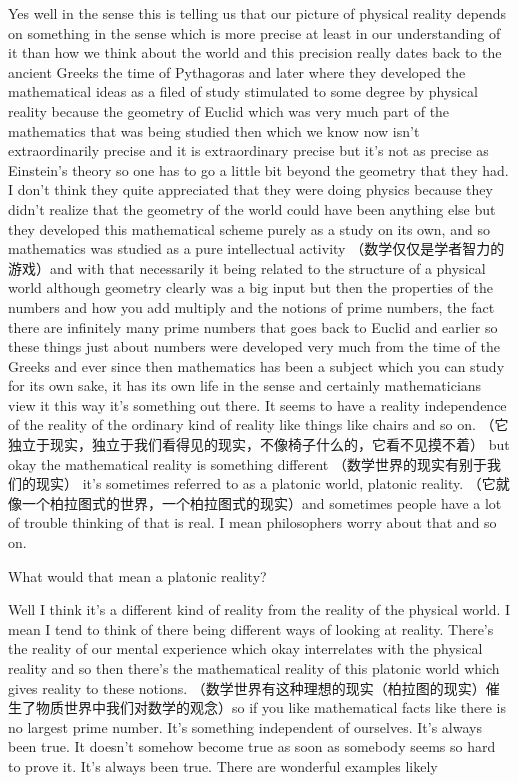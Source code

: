 \documentclass{article}
\begin{document}
Yes well in the sense this is telling us that our picture of physical reality depends on something in the sense which is more precise at least in our understanding of it than how we think about the world  and this precision really dates back to the ancient Greeks the time  of Pythagoras and later where they developed the mathematical ideas as a filed of study  stimulated to some degree by physical reality because the geometry of Euclid which was very much part of the mathematics that was being studied then which we know now isn't extraordinarily precise and it is  
 extraordinary precise  but it's not as precise as Einstein's theory so one has to go a little bit beyond the geometry that they had. I don't think they quite appreciated that they were doing physics because they didn't realize that the geometry of the world could have been anything else but they developed this mathematical scheme purely as a study on its own, and so mathematics was studied as a pure intellectual activity （数学仅仅是学者智力的游戏）and with that necessarily it being related to the structure of a physical world although geometry clearly was a big input but then the properties of the numbers and how you add multiply and the notions of prime numbers, the fact there are infinitely many prime numbers that goes back to Euclid and earlier so these things just about numbers were developed very much from the time of the Greeks and ever since then mathematics has been a subject which you can study for its own sake, it has its own life in the sense and certainly mathematicians view it this way it's something out there. It seems to have a reality independence of the reality of the ordinary kind of reality like things like chairs and so on. （它独立于现实，独立于我们看得见的现实，不像椅子什么的，它看不见摸不着） but okay the mathematical reality is something different （数学世界的现实有别于我们的现实） it's sometimes referred to as a platonic world, platonic reality. （它就像一个柏拉图式的世界，一个柏拉图式的现实）and sometimes people have a lot of trouble thinking of that is real. I mean philosophers worry about that and so on.
 
What would that mean a platonic reality?

Well I think it's a different kind of reality from the reality of the physical world. I mean I tend to think of there being different ways of looking at reality. There's the reality of our mental experience which okay interrelates with the physical reality and so then there's the mathematical reality of this platonic world which gives reality to these notions. （数学世界有这种理想的现实（柏拉图的现实）催生了物质世界中我们对数学的观念）so if you like mathematical facts like there is no largest prime number. It's something independent of ourselves. It's always been true. It doesn't somehow become true as soon as somebody seems so hard to prove it. It's always been true. There are wonderful examples likely 
\end{document}
